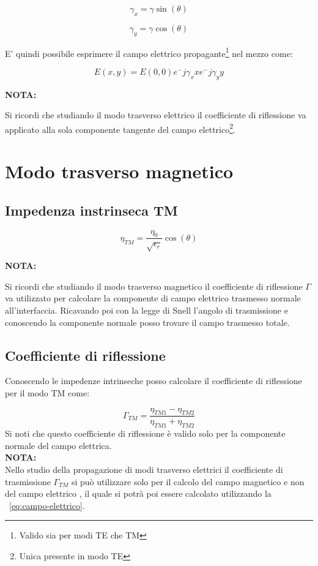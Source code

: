 \documentclass[10pt,a4paper]{report}
\begin{document}
			\[
			\gamma_x=\gamma\sin(\theta)
			\]

			\[
			\gamma_y=\gamma\cos(\theta)
			\]

			E' quindi possibile esprimere il campo elettrico propagante\footnote{Valido sia per modi TE che TM} nel mezzo come:
			
			\[
			E(x,y)=E(0,0)e^-{j\gamma_x x}e^-{j\gamma_y y}
			\]
		
			\textbf{NOTA:}

			Si ricordi che studiando il modo trasverso elettrico il coefficiente di riflessione va applicato alla sola componente tangente del campo elettrico\footnote{Unica presente in modo TE}.
			
	\section{Modo trasverso magnetico}

			\subsection{Impedenza instrinseca TM}

				\begin{equation}
					\eta_{TM}=\frac{\eta_0}{\sqrt{\epsilon_r}}\cos(\theta)
				\end{equation}

			\textbf{NOTA:}

			Si ricordi che studiando il modo trasverso magnetico il coefficiente di riflessione $\Gamma$ va utilizzato per calcolare la componente di campo elettrico trasmesso normale all'interfaccia.
			Ricavando poi con la legge di Snell l'angolo di trasmissione e conoscendo la componente normale posso trovare il campo trasmesso totale.

		\subsection{Coefficiente di riflessione}
			Conoscendo le impedenze intrinseche posso calcolare il coefficiente di riflessione per il modo TM come:

			\[
			\Gamma_{TM}=\frac{\eta_{TM1}-\eta_{TM2}}{\eta_{TM1}+\eta_{TM2}}
			\]
			 Si noti che questo coefficiente di riflessione è valido solo per la componente normale del campo elettrica.
			 \\
			 \textbf{NOTA:}
			 \\ 
			 Nello studio della propagazione di modi trasverso elettrici il coefficiente di trasmissione $\Gamma_{TM}$ si può utilizzare solo per il calcolo del campo magnetico e non del campo elettrico , il quale si potrà poi essere calcolato utilizzando la ~\ref{eq:campo-elettrico}.
\end{document}

